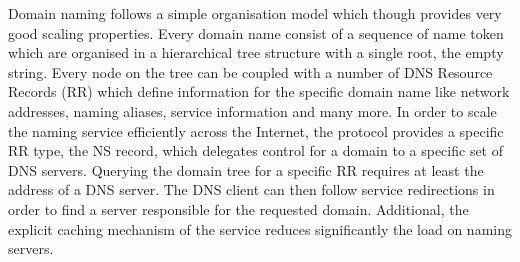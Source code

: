 Domain naming follows a simple organisation model which though provides very
good scaling properties. Every domain name consist of a sequence of name token
which are organised in a hierarchical tree structure with a single root, the
empty string. Every node on the tree can be coupled with a number of DNS
Resource Records (RR) which define information for the specific domain name like
network addresses, naming aliases, service information and many more. In order
to scale the naming service efficiently across the Internet, the protocol
provides a specific RR type, the NS record, which delegates control for a
domain to a specific set of DNS servers. Querying the domain tree for a
specific RR requires at least the address of a DNS server. The DNS client can
then follow service redirections in order to find a server responsible for the
requested domain.  Additional, the explicit caching mechanism of the service
reduces significantly the load on naming servers.



